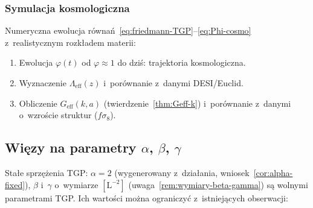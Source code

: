 \subsubsection{Symulacja kosmologiczna}

Numeryczna ewolucja r\'owna\'n~\eqref{eq:friedmann-TGP}--\eqref{eq:Phi-cosmo}
z~realistycznym rozk\l{}adem materii:
\begin{enumerate}[nosep]
  \item Ewolucja $\varphi(t)$ od $\varphi \approx 1$
        do dzi\'s: trajektoria kosmologiczna.
  \item Wyznaczenie $\Lambda_{\mathrm{eff}}(z)$ i~por\'ownanie
        z~danymi DESI/Euclid.
  \item Obliczenie $G_{\mathrm{eff}}(k, a)$
        (twierdzenie~\ref{thm:Geff-k}) i~por\'ownanie
        z~danymi o~wzro\'scie struktur ($f\sigma_8$).
\end{enumerate}

\subsection{Wi\k{e}zy na parametry $\alpha$, $\beta$, $\gamma$}\label{ssec:wiezy}

Sta\l{}e sprz\k{e}\.zenia TGP: $\alpha = 2$ (wygenerowany
z~dzia\l{}ania, wniosek~\ref{cor:alpha-fixed}),
$\beta$ i~$\gamma$ o~wymiarze $[\mathrm{L}^{-2}]$
(uwaga~\ref{rem:wymiary-beta-gamma})
s\k{a} wolnymi parametrami TGP.
Ich warto\'sci mo\.zna ograniczy\'c z~istniej\k{a}cych obserwacji:

